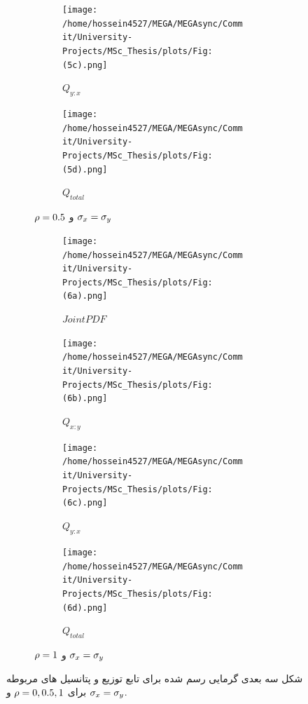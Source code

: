 \documentclass[a4paper,titlepage,12pt,fleqn,oneside]{report}
\begin{document}
\begin{figure}[tbp]
\begin{subfigure}[b]{\textwidth}
\begin{subfigure}[b]{0.24\textwidth}
				\renewcommand\thesubfigure{iii}
				\centering
				\texttt{[image: /home/hossein4527/MEGA/MEGAsync/Commit/University-Projects/MSc\_Thesis/plots/Fig:(5c).png]}
				\caption{$Q_{y:x}$}
				\label{fig:2.2.3}
			\end{subfigure}
			\hfill
			\begin{subfigure}[b]{0.24\textwidth}
				\renewcommand\thesubfigure{iv}
				\centering
				\texttt{[image: /home/hossein4527/MEGA/MEGAsync/Commit/University-Projects/MSc\_Thesis/plots/Fig:(5d).png]}
				\caption{$Q_{total}$}
				\label{fig:2.2.4}
			\end{subfigure}
			\caption{$\protect\rho =0.5$ و $\protect\sigma _{x}=\protect\sigma _{y}$}
			\label{fig:2.2}
		\end{subfigure}
		\begin{subfigure}[b]{\textwidth}
			\renewcommand\thesubfigure{c}
			\begin{subfigure}[b]{0.24\textwidth}
				\renewcommand\thesubfigure{i}
				\centering
				\texttt{[image: /home/hossein4527/MEGA/MEGAsync/Commit/University-Projects/MSc\_Thesis/plots/Fig:(6a).png]}
				\caption{$Joint PDF$}
				\label{fig:2.3.1}
			\end{subfigure}
			\hfill
			\begin{subfigure}[b]{0.24\textwidth}
				\renewcommand\thesubfigure{ii}
				\centering
				\texttt{[image: /home/hossein4527/MEGA/MEGAsync/Commit/University-Projects/MSc\_Thesis/plots/Fig:(6b).png]}
				\caption{$Q_{x:y}$}
				\label{fig:2.3.2}
			\end{subfigure}
			\hfill
			\begin{subfigure}[b]{0.24\textwidth}
				\renewcommand\thesubfigure{iii}
				\centering
				\texttt{[image: /home/hossein4527/MEGA/MEGAsync/Commit/University-Projects/MSc\_Thesis/plots/Fig:(6c).png]}
				\caption{$Q_{y:x}$}
				\label{fig:2.3.3}
			\end{subfigure}
			\hfill
			\begin{subfigure}[b]{0.24\textwidth}
				\renewcommand\thesubfigure{iv}
				\centering
				\texttt{[image: /home/hossein4527/MEGA/MEGAsync/Commit/University-Projects/MSc\_Thesis/plots/Fig:(6d).png]}
				\caption{$Q_{total}$}
				\label{fig:2.3.4}
			\end{subfigure}		
			\caption{$\protect\rho =1$ و $\protect\sigma _{x}=\protect\sigma _{y}$}
			\label{fig:2.3}
		\end{subfigure}
		\caption{شکل سه بعدی گرمایی رسم شده برای تابع توزیع و پتانسیل های مربوطه برای
			$\protect\rho =0,0.5,1$ و $\protect\sigma _{x}=\protect\sigma %
			_{y}$.}
		\label{fig:2t}
	\end{figure}
\end{document}
